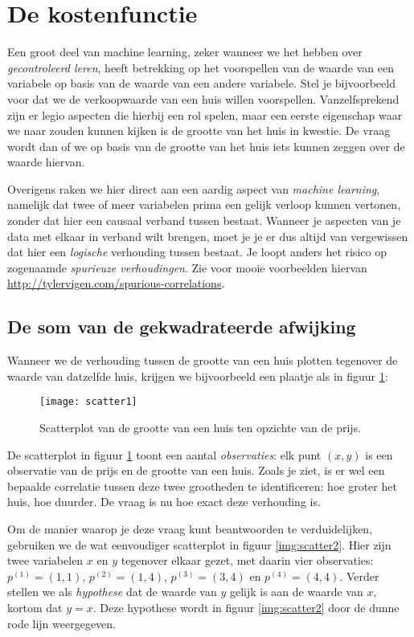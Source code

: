 
\section{De kostenfunctie}

Een groot deel van machine learning, zeker wanneer we het hebben over \textit{gecontroleerd leren}, heeft betrekking op het voorspellen van de waarde van een variabele op basis van de waarde van een andere variabele. Stel je bijvoorbeeld voor dat we de verkoopwaarde van een huis willen voorspellen. Vanzelfsprekend zijn er legio aspecten die hierbij een rol spelen, maar een eerste eigenschap waar we naar zouden kunnen kijken is de grootte van het huis in kwestie. De vraag wordt dan of we op basis van de grootte van het huis iets kunnen zeggen over de waarde hiervan.

Overigens raken we hier direct aan een aardig aspect van \textit{machine learning}, namelijk dat twee of meer variabelen prima een gelijk verloop kunnen vertonen, zonder dat hier een causaal verband tussen bestaat. Wanneer je aspecten van je data met elkaar in verband wilt brengen, moet je je er dus altijd van vergewissen dat hier een \textit{logische} verhouding tussen bestaat. Je loopt anders het risico op zogenaamde \textit{spurieuze verhoudingen}. Zie voor mooie voorbeelden hiervan \url{http://tylervigen.com/spurious-correlations}.

\subsection{De som van de gekwadrateerde afwijking}
Wanneer we de verhouding tussen de grootte van een huis plotten tegenover de waarde van datzelfde huis, krijgen we bijvoorbeeld een plaatje als in figuur \ref{img:scatter}:

\begin{figure}[h]
\centering
\texttt{[image: scatter1]}
\caption{Scatterplot van de grootte van een huis ten opzichte van de prijs.\label{img:scatter}}
\end{figure}

De scatterplot in figuur \ref{img:scatter} toont een aantal \textit{observaties}: elk punt $(x,y)$ is een observatie van de prijs en de grootte van een huis. Zoals je ziet, is er wel een bepaalde correlatie tussen deze twee grootheden te identificeren: hoe groter het huis, hoe duurder. De vraag is nu hoe exact deze verhouding is.

Om de manier waarop je deze vraag kunt beantwoorden te verduidelijken, gebruiken we de wat eenvoudiger scatterplot in figuur \ref{img:scatter2}. Hier zijn twee variabelen $x$ en $y$ tegenover elkaar gezet, met daarin vier observaties: $p^{(1)}=(1,1)$, $p^{(2)}=(1,4)$, $p^{(3)}=(3,4)$ en $p^{(4)}=(4,4)$. Verder stellen we als \textit{hypothese} dat de waarde van $y$ gelijk is aan de waarde van $x$, kortom dat $y=x$. Deze hypothese wordt in figuur \ref{img:scatter2} door de dunne rode lijn weergegeven.

